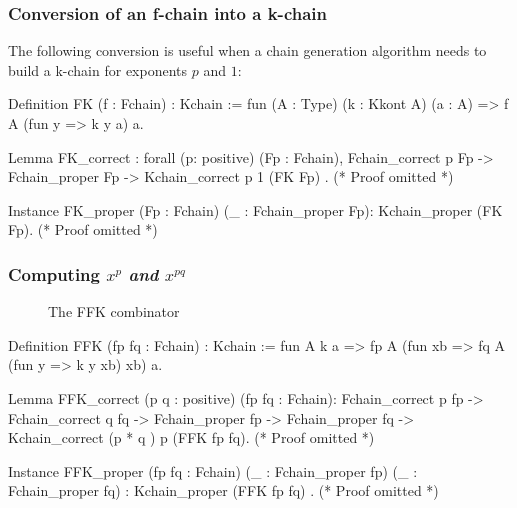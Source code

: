\subsubsection{Conversion of an f-chain into a k-chain}
The following conversion is useful when a chain generation algorithm
needs to build a k-chain for exponents $p$ and $1$:

\begin{Coqsrc}
  
Definition FK (f : Fchain) : Kchain :=
  fun (A : Type) (k : Kkont A) (a : A) =>
    f A (fun y => k y a) a.

Lemma FK_correct : forall (p: positive) (Fp : Fchain),
                     Fchain_correct  p Fp ->
                     Fchain_proper Fp ->
                     Kchain_correct p 1 (FK Fp) .
(* Proof omitted *)

Instance  FK_proper  (Fp : Fchain) (_ : Fchain_proper Fp):
  Kchain_proper (FK Fp).
(* Proof omitted *)
\end{Coqsrc}

\subsubsection{Computing $x^p$ \emph{and} $x^{pq}$}


\begin{figure}[h]
  \centering
  \caption{The FFK combinator}
  \label{fig:FFK}
\end{figure}

\begin{Coqsrc}
Definition FFK (fp fq : Fchain) : Kchain :=
  fun A k a =>  fp A (fun xb  => fq A (fun y => k y xb) xb) a. 


Lemma FFK_correct  (p q  : positive) (fp fq : Fchain):
    Fchain_correct p fp  ->
    Fchain_correct q fq ->
    Fchain_proper fp ->
    Fchain_proper fq -> Kchain_correct  (p * q ) p (FFK fp fq).
(* Proof omitted *)

Instance FFK_proper  (fp fq : Fchain)
    (_ :   Fchain_proper fp)
    (_ :  Fchain_proper fq) :  Kchain_proper (FFK fp fq) .
(* Proof omitted *)
\end{Coqsrc}

